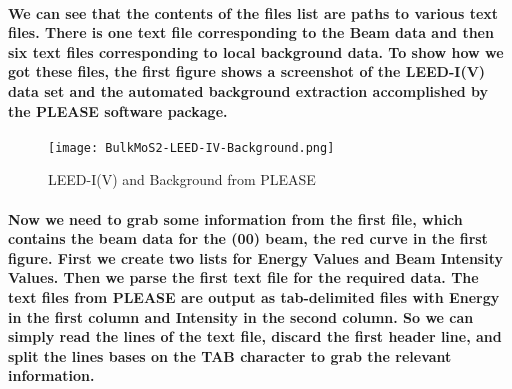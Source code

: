 \documentclass[11pt]{article}
\makeatletter
\def\maxwidth{\ifdim\Gin@nat@width>\linewidth\linewidth
    \else\Gin@nat@width\fi}
\let\Oldincludegraphics\includegraphics
\renewcommand{\includegraphics}[1]{\Oldincludegraphics[width=.8\maxwidth]{#1}}
\makeatother
\begin{document}
    \paragraph{We can see that the contents of the files list are paths to
various text files. There is one text file corresponding to the Beam
data and then six text files corresponding to local background data. To
show how we got these files, the first figure shows a screenshot of the
LEED-I(V) data set and the automated background extraction accomplished
by the PLEASE software
package.}\label{we-can-see-that-the-contents-of-the-files-list-are-paths-to-various-text-files.-there-is-one-text-file-corresponding-to-the-beam-data-and-then-six-text-files-corresponding-to-local-background-data.-to-show-how-we-got-these-files-the-first-figure-shows-a-screenshot-of-the-leed-iv-data-set-and-the-automated-background-extraction-accomplished-by-the-please-software-package.}

    \begin{figure}
\centering
\texttt{[image: BulkMoS2-LEED-IV-Background.png]}
\caption{LEED-I(V) and Background from PLEASE}
\end{figure}

    \paragraph{Now we need to grab some information from the first file,
which contains the beam data for the (00) beam, the red curve in the
first figure. First we create two lists for Energy Values and Beam
Intensity Values. Then we parse the first text file for the required
data. The text files from PLEASE are output as tab-delimited files with
Energy in the first column and Intensity in the second column. So we can
simply read the lines of the text file, discard the first header line,
and split the lines bases on the TAB character to grab the relevant
information.}\label{now-we-need-to-grab-some-information-from-the-first-file-which-contains-the-beam-data-for-the-00-beam-the-red-curve-in-the-first-figure.-first-we-create-two-lists-for-energy-values-and-beam-intensity-values.-then-we-parse-the-first-text-file-for-the-required-data.-the-text-files-from-please-are-output-as-tab-delimited-files-with-energy-in-the-first-column-and-intensity-in-the-second-column.-so-we-can-simply-read-the-lines-of-the-text-file-discard-the-first-header-line-and-split-the-lines-bases-on-the-tab-character-to-grab-the-relevant-information.}
\end{document}
